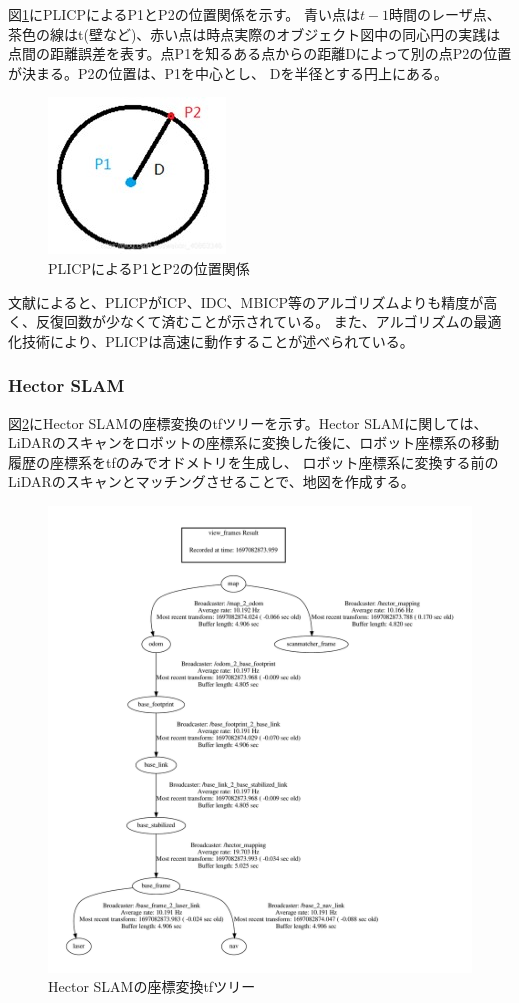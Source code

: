 図\ref{slam:plicp_p1p2}にPLICPによるP1とP2の位置関係を示す。
青い点は$t-1$時間のレーザ点、茶色の線はt(壁など)、赤い点は時点実際のオブジェクト図中の同心円の実践は点間の距離誤差を表す。点P1を知るある点からの距離Dによって別の点P2の位置が決まる。P2の位置は、P1を中心とし、
Dを半径とする円上にある。

\begin{figure}[h]
  \begin{center}
    \includegraphics[width=.3\linewidth]{img/slam_27.jpg}
    \caption{PLICPによるP1とP2の位置関係}
    \label{slam:plicp_p1p2}
  \end{center}
\end{figure}

文献\cite{slam:china}によると、PLICPがICP、IDC、MBICP等のアルゴリズムよりも精度が高く、反復回数が少なくて済むことが示されている。
また、アルゴリズムの最適化技術により、PLICPは高速に動作することが述べられている。

\subsubsection{Hector SLAM}
図\ref{slam:tf3}にHector SLAMの座標変換のtfツリーを示す。Hector SLAMに関しては、LiDARのスキャンをロボットの座標系に変換した後に、ロボット座標系の移動履歴の座標系をtfのみでオドメトリを生成し、
ロボット座標系に変換する前のLiDARのスキャンとマッチングさせることで、地図を作成する。

\begin{figure}[h]
  \begin{center}
  \includegraphics[width=.8\linewidth]{img/slam_28.pdf}
  \caption{Hector SLAMの座標変換tfツリー}
  \label{slam:tf3}
  \end{center}
\end{figure}


